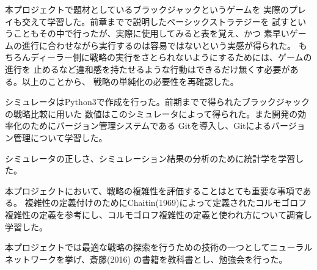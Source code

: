 本プロジェクトで題材としているブラックジャックというゲームを
実際のプレイも交えて学習した。前章までで説明したベーシックストラテジーを
試すということもその中で行ったが、実際に使用してみると表を覚え、かつ
素早いゲームの進行に合わせながら実行するのは容易ではないという実感が得られた。
もちろんディーラー側に戦略の実行をさとられないようにするためには、ゲームの進行を
止めるなど違和感を持たせるような行動はできるだけ無くす必要がある。以上のことから、
戦略の単純化の必要性を再確認した。

シミュレータはPython3で作成を行った。前期までで得られたブラックジャックの戦略比較に用いた
数値はこのシミュレータによって得られた。また開発の効率化のためにバージョン管理システムである
Gitを導入し、Gitによるバージョン管理について学習した。

シミュレータの正しさ、シミュレーション結果の分析のために統計学を学習した。

本プロジェクトにおいて、戦略の複雑性を評価することはとても重要な事項である。
複雑性の定義付けのためにChaitin(1969)によって定義されたコルモゴロフ複雑性の定義を参考にし、コルモゴロフ複雑性の定義と使われ方について調査し学習した。

本プロジェクトでは最適な戦略の探索を行うための技術の一つとしてニューラルネットワークを挙げ、斎藤(2016) の書籍を教科書とし、勉強会を行った。


